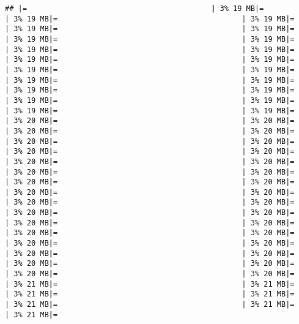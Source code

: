\documentclass[
]{article}
\begin{document}
\begin{verbatim}
## |=                                          | 3% 19 MB|=                                          | 3% 19 MB|=                                          | 3% 19 MB|=                                          | 3% 19 MB|=                                          | 3% 19 MB|=                                          | 3% 19 MB|=                                          | 3% 19 MB|=                                          | 3% 19 MB|=                                          | 3% 19 MB|=                                          | 3% 19 MB|=                                          | 3% 19 MB|=                                          | 3% 19 MB|=                                          | 3% 19 MB|=                                          | 3% 19 MB|=                                          | 3% 19 MB|=                                          | 3% 19 MB|=                                          | 3% 19 MB|=                                          | 3% 19 MB|=                                          | 3% 19 MB|=                                          | 3% 19 MB|=                                          | 3% 19 MB|=                                          | 3% 20 MB|=                                          | 3% 20 MB|=                                          | 3% 20 MB|=                                          | 3% 20 MB|=                                          | 3% 20 MB|=                                          | 3% 20 MB|=                                          | 3% 20 MB|=                                          | 3% 20 MB|=                                          | 3% 20 MB|=                                          | 3% 20 MB|=                                          | 3% 20 MB|=                                          | 3% 20 MB|=                                          | 3% 20 MB|=                                          | 3% 20 MB|=                                          | 3% 20 MB|=                                          | 3% 20 MB|=                                          | 3% 20 MB|=                                          | 3% 20 MB|=                                          | 3% 20 MB|=                                          | 3% 20 MB|=                                          | 3% 20 MB|=                                          | 3% 20 MB|=                                          | 3% 20 MB|=                                          | 3% 20 MB|=                                          | 3% 20 MB|=                                          | 3% 20 MB|=                                          | 3% 20 MB|=                                          | 3% 20 MB|=                                          | 3% 20 MB|=                                          | 3% 20 MB|=                                          | 3% 20 MB|=                                          | 3% 20 MB|=                                          | 3% 21 MB|=                                          | 3% 21 MB|=                                          | 3% 21 MB|=                                          | 3% 21 MB|=                                          | 3% 21 MB|=                                          | 3% 21 MB|=                                          | 3% 21 MB|=          
\end{verbatim}
\end{document}
